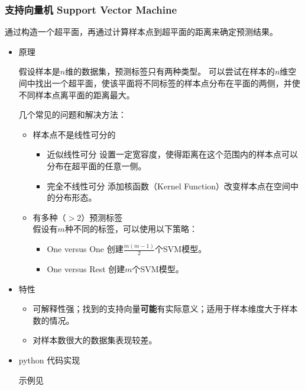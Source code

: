 \documentclass{article}
\begin{document}
\subsubsection{支持向量机 Support Vector Machine}

通过构造一个超平面，再通过计算样本点到超平面的距离来确定预测结果。

\begin{itemize}

\item{原理}

假设样本是$n$维的数据集，预测标签只有两种类型。
可以尝试在样本的$n$维空间中找出一个超平面，使该平面将不同标签的样本点分布在平面的两侧，并使不同样本点离平面的距离最大。

几个常见的问题和解决方法：
\begin{itemize}
    \item{样本点不是线性可分的}
    \begin{itemize}
        \item{近似线性可分}
            设置一定宽容度，使得距离在这个范围内的样本点可以分布在超平面的任意一侧。
        \item{完全不线性可分}
            添加核函数（Kernel Function）改变样本点在空间中的分布形态。
    \end{itemize}
    \item{有多种（$>2$）预测标签}\\
        假设有$m$种不同的标签，可以使用以下策略：
        \begin{itemize}
            \item{One versus One} 创建$\frac{m(m - 1)}{2}$个SVM模型。
            \item{One versus Rest} 创建$m$个SVM模型。
        \end{itemize}
\end{itemize}

\item{特性}

\begin{itemize}
    \item 可解释性强；找到的支持向量\textbf{可能}有实际意义；适用于样本维度大于样本数的情况。
    \item 对样本数很大的数据集表现较差。
\end{itemize}

\item{python 代码实现}

示例见

\end{itemize}
\end{document}
